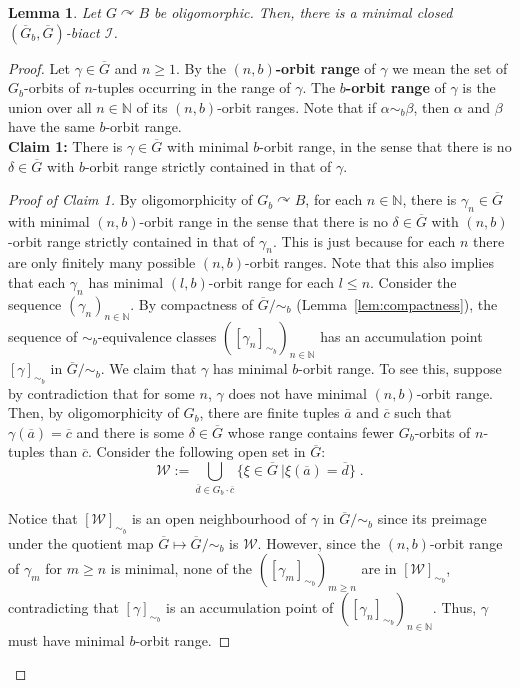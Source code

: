 \documentclass{article}
\newtheorem{lemma}[theorem]{Lemma}
\theoremstyle{remark}
\theoremstyle{definition}
\def\acts{\curvearrowright}
\begin{document}
\begin{lemma}\label{lem:existencebiacts} Let $G\acts B$ be oligomorphic. Then, there is a minimal closed $(\overline{G}_b, \overline{G})$-biact $\mathcal{I}$.
\end{lemma}
\begin{proof}
Let $\gamma\in\overline{G}$ {and $n\geq 1$}. By the $(n,b)$\textbf{-orbit range} of $\gamma$ we mean the set of $G_b$-orbits of $n$-tuples  occurring in the range of $\gamma$. The $b$\textbf{-orbit range} of $\gamma$ is the union over all $n\in\mathbb{N}$ of its $(n,b)$-orbit ranges. Note that if $\alpha\sim_b\beta$, then $\alpha$ and $\beta$ have the same $b$-orbit range.\\

\textbf{Claim 1:} There is $\gamma\in\overline{G}$ with minimal $b$-orbit range, in the sense that there is no $\delta\in \overline{G}$ with $b$-orbit range strictly contained in that of $\gamma$.
\begin{proof}[Proof of Claim 1] 
{By oligomorphicity of $G_b\acts B$, for each $n\in\mathbb{N}$, there is $\gamma_n\in\overline{G}$ with minimal $(n,b)$-orbit range in the sense that there is no $\delta\in\overline{G}$ with $(n,b)$-orbit range strictly contained in that of $\gamma_n$. This is just because for each $n$ there are only finitely many possible $(n,b)$-orbit ranges. Note that {this also implies that} each $\gamma_n$ has minimal $(l,b)$-orbit range for each $l\leq n$. Consider the sequence $(\gamma_n)_{n\in\mathbb{N}}$. By compactness of $\overline{G}/{\sim_b}$  (Lemma~\ref{lem:compactness}), the sequence of $\sim_b$-equivalence classes $([\gamma_n]_{\sim_b})_{n\in\mathbb{N}}$ has an accumulation point $[\gamma]_{\sim_b}$ in  $\overline{G}/{\sim_b}$. We claim that $\gamma$ has minimal $b$-orbit range. To see this, suppose by contradiction that for some $n$, $\gamma$ does not have minimal $(n,b)$-orbit range. Then, by oligomorphicity of $G_b$, there are finite tuples $\overline{a}$ and $\overline{c}$ such that $\gamma(\overline{a})=\overline{c}$ and there is some $\delta\in\overline{G}$ whose range contains fewer $G_b$-orbits of $n$-tuples than $\overline{c}$. Consider the following open {set} %
in $\overline{G}$:}
\[ \mathcal{W}:=\bigcup_{\overline{d}\in G_b\cdot  \overline{c}}\{\xi\in\overline{G} \ \vert \xi(\overline{a})=\overline{d}\}\;.\]

{Notice that $[\mathcal{W}]_{\sim_b}$ is an open neighbourhood of $\gamma$ in $\overline{G}/{\sim_b}$ since its preimage under the quotient map $\overline{G}\mapsto\overline{G}/\sim_b$ is $\mathcal{W}$. However, since the $(n,b)$-orbit range of $\gamma_m$ for $m\geq n$ is minimal, none of the $([\gamma_m]_{\sim_b})_{m\geq n}$ are in $[\mathcal{W}]_{\sim_b}$, contradicting  that $[\gamma]_{\sim_b}$ is an accumulation point of $([\gamma_n]_{\sim_b})_{n\in\mathbb{N}}$.  Thus, $\gamma$ must have minimal $b$-orbit range.}
\end{proof}


\end{proof}
\end{document}

